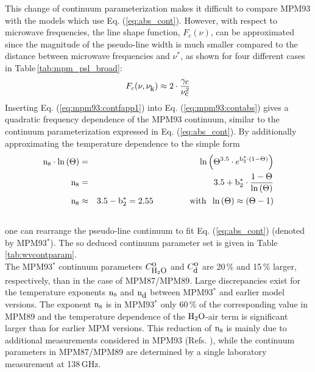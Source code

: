 This change of continuum parameterization makes it difficult 
to compare MPM93 with the models which use Eq. (\ref{eq:abs_cont}). 
However, with respect to microwave frequencies, the 
line shape function, $F_c(\nu)$, can be approximated since 
the magnitude of the pseudo-line width is much smaller compared to the 
distance between microwave frequencies and $\nu^*$, as 
shown for four different cases in Table\,\ref{tab:mpm_psl_broad}:
\begin{equation}
 \label{eq:mpm93:contfapp1}
 F_{c}(\nu,\nu_{\mbox{\rm \small k}}) \approx 2 \cdot \frac{\gamma_{\mbox{\rm \small c}}}{\nu_{\mbox{\rm \small c}}^2}
\end{equation}
Inserting Eq. (\ref{eq:mpm93:contfapp1}) into Eq. (\ref{eq:mpm93:contabs})
gives a quadratic frequency dependence of the MPM93 continuum,
similar to the continuum parameterization expressed in 
Eq. (\ref{eq:abs_cont}). By additionally approximating 
the temperature dependence to the simple form
\begin{eqnarray}
  \xs\cdot\ln{(\Theta)} & = & 
  \ln{\left(\Theta^{3.5} \cdot e^{\bzks\cdot(1-\Theta)}\right)}\nonumber\\
%
  \xs  & = & 3.5 +
  \bzks\cdot\frac{1-\Theta}{\ln{(\Theta)}}\nonumber\\
%
  \xs & \approx & 3.5 -\bzks = 2.55\hspace*{15mm}\mbox{with}\hspace*{2mm}
                 \ln{(\Theta)}\approx(\Theta-1)\\
\nonumber
\end{eqnarray}
%
one can rearrange the pseudo-line continuum to fit Eq. (\ref{eq:abs_cont})
(denoted by MPM93$^*$). The so deduced continuum parameter set is given in 
Table \ref{tab:wvcontparam}.\\
The MPM93$^*$ continuum parameters $C^{\mbox{\rm o}}_{\mbox{\rm \small H}_{2}\mbox{\rm \small O}}$ and $C^{\mbox{\rm o}}_{\mbox{\rm \small d}}$ are 20\,\% and 
15\,\% larger, respectively, than in the case of MPM87/MPM89. 
Large discrepancies exist for the temperature exponents ${\rm n}_{\mbox{\rm \small s}}$ 
and ${\rm n}_{\mbox{\rm \small d}}$ between MPM93$^*$ and earlier model versions. The 
exponent ${\rm n}_{\mbox{\rm \small s}}$ is in MPM93$^*$ only 60\,\% of the corresponding 
value in MPM89 and the temperature dependence of the $\mbox{H}_2\mbox{O}$-air 
term is significant larger than for earlier MPM versions.
This reduction of ${\rm n}_{\mbox{\rm \small s}}$ is mainly due to additional measurements 
considered in MPM93 (Refs. \cite{beckerautler:46,godonetal:92}), 
while the continuum parameters in MPM87/MPM89 are determined 
by a single laboratory measurement at 138\,GHz.




